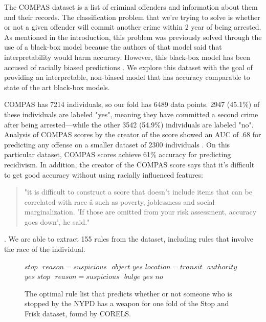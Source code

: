 The COMPAS dataset is a list of criminal offenders and information about them and their records.
The classification problem that we're trying to solve is whether or not a given offender will commit another crime within 2 year of being arrested.
As mentioned in the introduction, this problem was previously solved through the use of a black-box model because the authors of that model said that interpretability would harm accuracy.
However, this black-box model has been accused of racially biased predictions \cite{LarsonMaKiAn16}.
We explore this dataset with the goal of providing an interpretable, non-biased model that has accuracy comparable to state of the art black-box models.

COMPAS has 7214 individuals, so our fold has 6489 data points.
2947 (45.1\%) of these individuals are labeled "yes", meaning they have committed a second crime after being arrested---while the other 3542 (54.9\%) individuals are labeled "no".
Analysis of COMPAS scores by the creator of the score showed an AUC of .68 for predicting any offense on a smaller dataset of 2300 individuals \cite{BrennanDiEh09}.
On this particular dataset, COMPAS scores achieve 61\% accuracy for predicting recidivism. 
In addition, the creator of the COMPAS score says that it's difficult to get good accuracy without using racially influenced features:
\begin{quote}
"it is difficult to construct a score that doesn't include items that can be correlated with race â such as poverty, joblessness and social marginalization. 'If those are omitted from your risk assessment, accuracy goes down', he said."
\end{quote}\cite{LarsonMaKiAn16}.
We are able to extract 155 rules from the dataset, including rules that involve the race of the individual.

\begin{figure}[t!]
\begin{algorithmic}
\normalsize
\State \bif $stop\text{ }reason=suspicious\text{ }object$ \bthen $yes$
\State \belif $location=transit\text{ }authority$ \bthen $yes$
\State \belif $stop\text{ }reason=suspicious\text{ }bulge$ \bthen $yes$
\State \belse $no$
\end{algorithmic}
\caption{The optimal rule list that predicts whether or not someone who is stopped by the NYPD has a weapon for one fold of the Stop and Frisk dataset, found by CORELS.}
\label{fig:rule-list-stopfrisk}
\end{figure}

